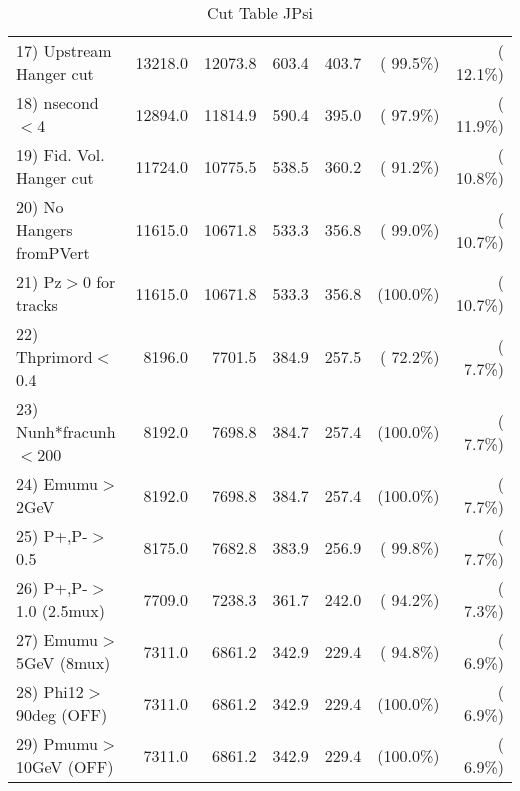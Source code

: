 \begin{table}[h!]
\begin{tabular}{||l||r|r|r|r|r|r||}
 17) Upstream Hanger cut  &      13218.0 &      12073.8 &        603.4 &        403.7 & ( 99.5\%) & ( 12.1\%) \\
 18) nsecond$<$4          &      12894.0 &      11814.9 &        590.4 &        395.0 & ( 97.9\%) & ( 11.9\%) \\
 19) Fid. Vol. Hanger cut &      11724.0 &      10775.5 &        538.5 &        360.2 & ( 91.2\%) & ( 10.8\%) \\
 20) No Hangers fromPVert &      11615.0 &      10671.8 &        533.3 &        356.8 & ( 99.0\%) & ( 10.7\%) \\
 21) Pz$>$0 for tracks    &      11615.0 &      10671.8 &        533.3 &        356.8 & (100.0\%) & ( 10.7\%) \\
 22) Thprimord$<$0.4      &       8196.0 &       7701.5 &        384.9 &        257.5 & ( 72.2\%) & (  7.7\%) \\
 23) Nunh*fracunh$<$200   &       8192.0 &       7698.8 &        384.7 &        257.4 & (100.0\%) & (  7.7\%) \\
 24) Emumu$>$2GeV         &       8192.0 &       7698.8 &        384.7 &        257.4 & (100.0\%) & (  7.7\%) \\
 25) P+,P-$>$0.5          &       8175.0 &       7682.8 &        383.9 &        256.9 & ( 99.8\%) & (  7.7\%) \\
 26) P+,P-$>$1.0 (2.5mux) &       7709.0 &       7238.3 &        361.7 &        242.0 & ( 94.2\%) & (  7.3\%) \\
 27) Emumu$>$5GeV  (8mux) &       7311.0 &       6861.2 &        342.9 &        229.4 & ( 94.8\%) & (  6.9\%) \\
 28) Phi12$>$90deg  (OFF) &       7311.0 &       6861.2 &        342.9 &        229.4 & (100.0\%) & (  6.9\%) \\
 29) Pmumu$>$10GeV  (OFF) &       7311.0 &       6861.2 &        342.9 &        229.4 & (100.0\%) & (  6.9\%) \\
 \hline
 \hline
 \end{tabular}
 \caption{Cut Table  JPsi     }
 \label{tab-cutcohjpsi-mumu_cohrhop}
 \end{table}
